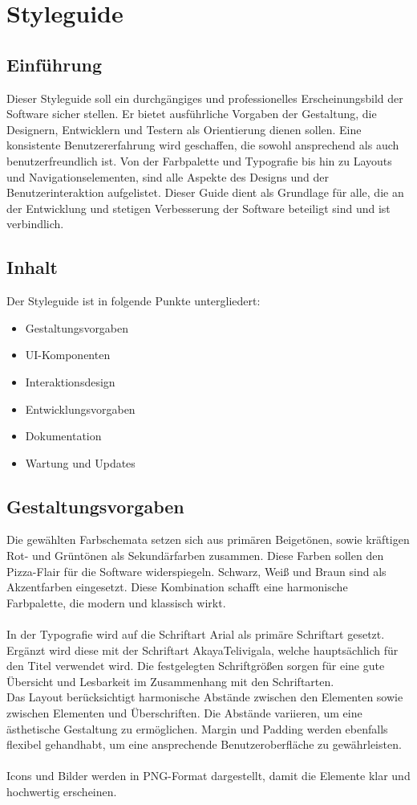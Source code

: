 \section{Styleguide}
\subsection{Einführung}
Dieser Styleguide soll ein durchgängiges und professionelles Erscheinungsbild der Software sicher stellen.
Er bietet ausführliche Vorgaben der Gestaltung, die Designern, Entwicklern und Testern als Orientierung dienen sollen.
Eine konsistente Benutzererfahrung wird geschaffen, die sowohl ansprechend als auch benutzerfreundlich ist.
Von der Farbpalette und Typografie bis hin zu Layouts und Navigationselementen, sind alle Aspekte des Designs und der Benutzerinteraktion aufgelistet.
Dieser Guide dient als Grundlage für alle, die an der Entwicklung und stetigen Verbesserung der Software beteiligt sind und ist verbindlich.

\subsection{Inhalt}
Der Styleguide ist in folgende Punkte untergliedert:

\begin{itemize}
    \item Gestaltungsvorgaben
    \item UI-Komponenten
    \item Interaktionsdesign
    \item Entwicklungsvorgaben
    \item Dokumentation
    \item Wartung und Updates
\end{itemize}

\subsection{Gestaltungsvorgaben}
Die gewählten Farbschemata setzen sich aus primären Beigetönen, sowie kräftigen Rot- und Grüntönen als Sekundärfarben zusammen.
Diese Farben sollen den Pizza-Flair für die Software widerspiegeln. Schwarz, Weiß und Braun sind als Akzentfarben eingesetzt.
Diese Kombination schafft eine harmonische Farbpalette, die modern und klassisch wirkt.\\
\\
In der Typografie wird auf die Schriftart Arial als primäre Schriftart gesetzt. Ergänzt wird diese mit der Schriftart AkayaTelivigala,
welche hauptsächlich für den Titel verwendet wird. Die festgelegten Schriftgrößen sorgen für eine gute Übersicht und Lesbarkeit im Zusammenhang mit den Schriftarten.\\
Das Layout berücksichtigt harmonische Abstände zwischen den Elementen sowie zwischen Elementen und Überschriften.
Die Abstände variieren, um eine ästhetische Gestaltung zu ermöglichen. Margin und Padding werden ebenfalls flexibel gehandhabt,
um eine ansprechende Benutzeroberfläche zu gewährleisten.\\
\\
Icons und Bilder werden in PNG-Format dargestellt, damit die Elemente klar und hochwertig erscheinen.

